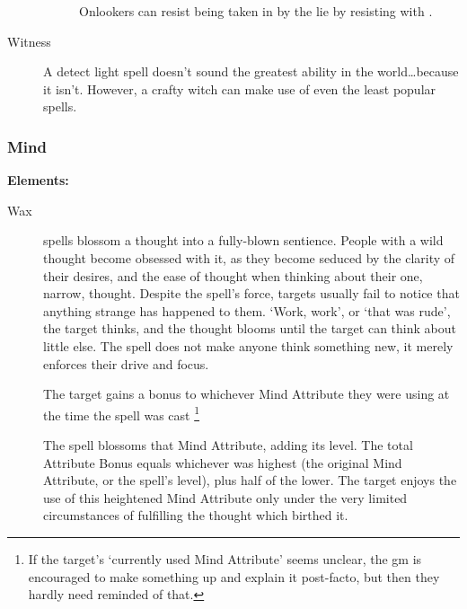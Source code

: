\begin{multicols}{2}
\begin{description}
\begin{description}
        Onlookers can resist being taken in by the lie by resisting with .
    \end{description}
  \item[Witness]
    A detect light spell doesn't sound the greatest ability in the world\ldots because it isn't.
    However, a crafty witch can make use of even the least popular spells.
\end{description}

\subsubsection{Mind}

\textbf{Elements:}

\begin{description}
  \item[Wax]
    spells blossom a thought into a fully-blown sentience.
    People with a wild thought become obsessed with it, as they become seduced by the clarity of their desires, and the ease of thought when thinking about their one, narrow, thought.
    Despite the spell's force, targets usually fail to notice that anything strange has happened to them.
    `Work, work', or `that was rude', the target thinks, and the thought blooms until the target can think about little else.
    The spell does not make anyone think something new, it merely enforces their drive and focus.

    The target gains a bonus to whichever Mind Attribute they were using at the time the spell was cast%
    \footnote{If the target's `currently used Mind Attribute' seems unclear, the \gls{gm} is encouraged to make something up and explain it post-facto, but then they hardly need reminded of that.}

    The spell blossoms that Mind Attribute, adding its level.
    The total Attribute Bonus equals whichever was highest (the original Mind Attribute, or the spell's level), plus half of the lower.%
    The target enjoys the use of this heightened Mind Attribute only under the very limited circumstances of fulfilling the thought which birthed it.


\end{description}
\end{multicols}
